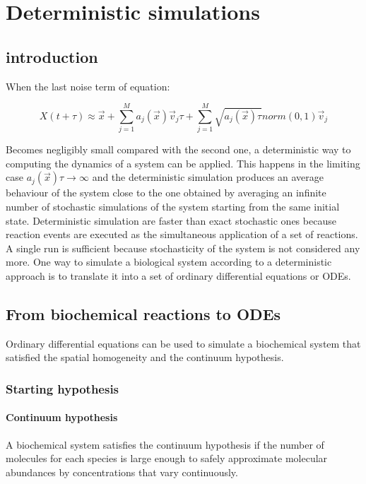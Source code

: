 \graphicspath{{chapters/05/images/}}
\chapter{Deterministic simulations}

\section{introduction}
When the last noise term of equation:

$$X(t+\tau)\approx \vec{x}+\sum\limits_{j=1}^Ma_j(\vec{x})\vec{v}_j\tau + \sum\limits_{j=1}^M\sqrt{a_j(\vec{x})\tau}norm(0,1)\vec{v}_j$$

Becomes negligibly small compared with the second one, a deterministic way to computing the dynamics of a system can be applied.
This happens in the limiting case $a_j(\vec{x})\tau\rightarrow\infty$ and the deterministic simulation produces an average behaviour of the system close to the one obtained by averaging an infinite number of stochastic simulations of the system starting from the same initial state.
Deterministic simulation are faster than exact stochastic ones because reaction events are executed as the simultaneous application of a set of reactions.
A single run is sufficient because stochasticity of the system is not considered any more.
One way to simulate a biological system according to a deterministic approach is to translate it into a set of ordinary differential equations or ODEs.

\section{From biochemical reactions to ODEs}
Ordinary differential equations can be used to simulate a biochemical system that satisfied the spatial homogeneity and the continuum hypothesis.

  \subsection{Starting hypothesis}

    \subsubsection{Continuum hypothesis}
    A biochemical system satisfies the continuum hypothesis if the number of molecules for each species is large enough to safely approximate molecular abundances by concentrations that vary continuously.

